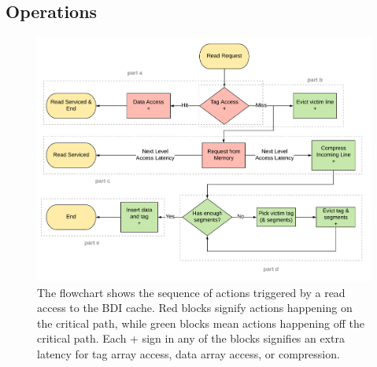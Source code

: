 \subsection{Operations}
\label{ssec:BDIOperations}
\begin{figure}[h]
    \includegraphics[width=\textwidth]{BDI_Read.pdf}
    \caption[BDI Read]{The flowchart shows the sequence of actions triggered by a read access to the BDI cache. Red blocks signify actions happening on the critical path, while green blocks mean actions happening off the critical path. Each + sign in any of the blocks signifies an extra latency for tag array access, data array access, or compression.}
    \label{fig:BDI_Read}
\end{figure}
